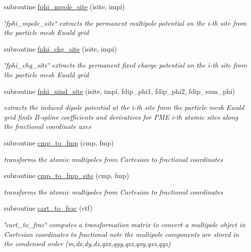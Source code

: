 \begin{DoxyCompactItemize}
subroutine \hyperlink{pmestuff_8f90_a75e54e1a670bd08b048f69a9940abe4c}{fphi\-\_\-mpole\-\_\-site} (isite, impi)
\begin{DoxyCompactList}\small\item\em \char`\"{}fphi\-\_\-mpole\-\_\-site\char`\"{} extracts the permanent multipole potential on the i-\/th site from the particle mesh Ewald grid \end{DoxyCompactList}\item 
subroutine \hyperlink{pmestuff_8f90_a804d1244cfafe8311d48bfceb77fdde6}{fphi\-\_\-chg\-\_\-site} (isite, impi)
\begin{DoxyCompactList}\small\item\em \char`\"{}fphi\-\_\-chg\-\_\-site\char`\"{} extracts the permanent fixed charge potential on the i-\/th site from the particle mesh Ewald grid \end{DoxyCompactList}\item 
subroutine \hyperlink{pmestuff_8f90_a7a5e0594cbf56a62ac01c2d370fadd74}{fphi\-\_\-uind\-\_\-site} (isite, impi, fdip\-\_\-phi1, fdip\-\_\-phi2, fdip\-\_\-sum\-\_\-phi)
\begin{DoxyCompactList}\small\item\em extracts the induced dipole potential at the i-\/th site from the particle mesh Ewald grid finds B-\/spline coefficients and derivatives for P\-M\-E i-\/th atomic sites along the fractional coordinate axes \end{DoxyCompactList}\item 
subroutine \hyperlink{pmestuff_8f90_a906ed69296071ce5f3674694f9b98d9b}{cmp\-\_\-to\-\_\-fmp} (cmp, fmp)
\begin{DoxyCompactList}\small\item\em transforms the atomic multipoles from Cartesian to fractional coordinates \end{DoxyCompactList}\item 
subroutine \hyperlink{pmestuff_8f90_a5efd8955803838b82fa81b021a32cf5e}{cmp\-\_\-to\-\_\-fmp\-\_\-site} (cmp, fmp)
\begin{DoxyCompactList}\small\item\em transforms the atomic multipoles from Cartesian to fractional coordinates \end{DoxyCompactList}\item 
subroutine \hyperlink{pmestuff_8f90_ab3a9c64aac2f01b68893073aa3221161}{cart\-\_\-to\-\_\-frac} (ctf)
\begin{DoxyCompactList}\small\item\em \char`\"{}cart\-\_\-to\-\_\-frac\char`\"{} computes a transformation matrix to convert a multipole object in Cartesian coordinates to fractional note the multipole components are stored in the condensed order (m,dx,dy,dz,qxx,qyy,qzz,qxy,qxz,qyz) \end{DoxyCompactList}\item 

\end{DoxyCompactItemize}
